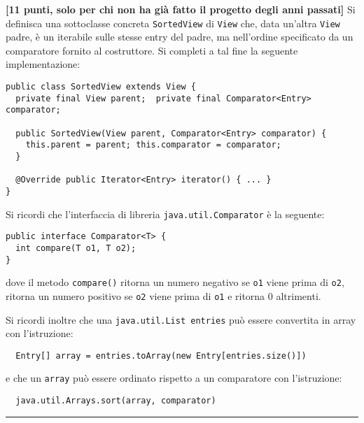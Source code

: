 \documentclass{article}[10pt]
\newcounter{esnu}
\newenvironment{esercizio}{\medskip \noindent {\bf Esercizio\addtocounter{esnu}{1} \arabic{esnu}}}{}
\begin{document}
\begin{esercizio}
\textbf{[11 punti, solo per chi non ha gi\`a fatto il progetto degli anni passati]}
Si definisca una sottoclasse concreta \texttt{SortedView} di \texttt{View} che, data
un'altra \texttt{View} padre, \`e un iterabile sulle stesse entry del padre, ma nell'ordine
specificato da un comparatore fornito al costruttore. Si completi a tal fine la seguente
implementazione:

{\scriptsize\begin{verbatim}
public class SortedView extends View {
  private final View parent;  private final Comparator<Entry> comparator;

  public SortedView(View parent, Comparator<Entry> comparator) {
    this.parent = parent; this.comparator = comparator;
  }

  @Override public Iterator<Entry> iterator() { ... }
}
\end{verbatim}}

\noindent
Si ricordi che l'interfaccia di libreria \texttt{java.util.Comparator} \`e la seguente:
{\scriptsize\begin{verbatim}
public interface Comparator<T> {
  int compare(T o1, T o2);
}
\end{verbatim}}

\noindent
dove il metodo \texttt{compare()} ritorna un numero negativo se \texttt{o1} viene
prima di \texttt{o2}, ritorna un numero positivo se \texttt{o2} viene prima di \texttt{o1}
e ritorna $0$ altrimenti.

Si ricordi inoltre che una \texttt{java.util.List entries} pu\`o essere convertita in array
con l'istruzione:

{\scriptsize\begin{verbatim}
  Entry[] array = entries.toArray(new Entry[entries.size()])
\end{verbatim}}

\noindent
e che un \texttt{array} pu\`o essere ordinato rispetto a un comparatore con l'istruzione:
{\scriptsize\begin{verbatim}
  java.util.Arrays.sort(array, comparator)
\end{verbatim}}
\end{esercizio}

\hrule

\mbox{}\\
\end{document}
